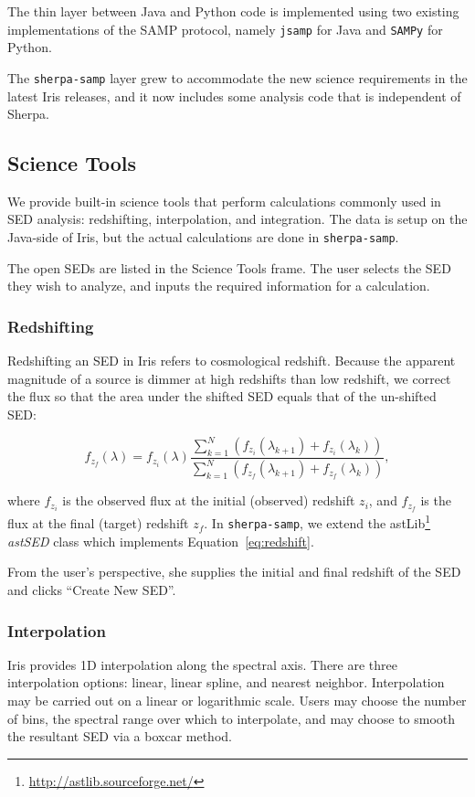 \documentclass[final,5p]{elsarticle}
\begin{document}
The thin layer between Java and Python code is implemented using two existing implementations of the SAMP protocol, namely \verb|jsamp| for Java and \verb|SAMPy| for Python.

The \verb|sherpa-samp| layer grew to accommodate the new science requirements in the latest Iris releases, and it now includes some analysis code that is independent of Sherpa.

\subsection{Science Tools}
We provide built-in science tools that perform calculations commonly used in SED analysis: redshifting, interpolation, and integration. The data is setup on the Java-side of Iris, but the actual calculations are done in \verb|sherpa-samp|.

The open SEDs are listed in the Science Tools frame. The user selects the SED they wish to analyze, and inputs the required information for a calculation.

\subsubsection{Redshifting}
Redshifting an SED in Iris refers to cosmological redshift. Because the apparent magnitude of a source is dimmer at high redshifts than low redshift, we correct the flux so that the area under the shifted SED equals that of the un-shifted SED:

\begin{equation} \label{eq:redshift}
f_{z_{f}}(\lambda) = f_{z_{i}}(\lambda) \frac{\sum_{k=1}^N (f_{z_{i}}(\lambda_{k+1})+f_{z_{i}}(\lambda_{k}))}{\sum_{k=1}^N (f_{z_{f}}(\lambda_{k+1})+f_{z_{f}}(\lambda_{k}))},
\end{equation}

where $f_{z_i}$ is the observed flux at the initial (observed) redshift $z_i$, and $f_{z_f}$ is the flux at the final (target) redshift $z_f$. In \verb|sherpa-samp|, we extend the astLib\footnote{\url{http://astlib.sourceforge.net/}} \textit{astSED} class which implements Equation~\ref{eq:redshift}.

From the user's perspective, she supplies the initial and final redshift of the SED and clicks ``Create New SED''.

\subsubsection{Interpolation}
Iris provides 1D interpolation along the spectral axis. There are three interpolation options: linear, linear spline, and nearest neighbor. Interpolation may be carried out on a linear or logarithmic scale. Users may choose the number of bins, the spectral range over which to interpolate, and may choose to smooth the resultant SED via a boxcar method.
\end{document}

